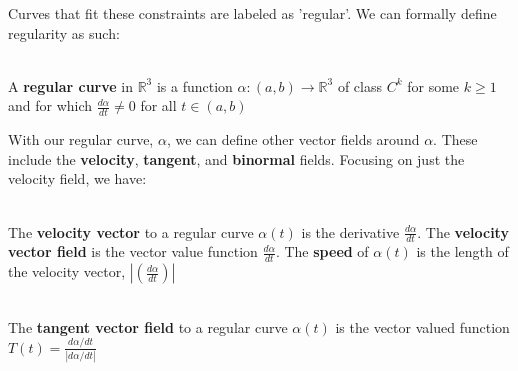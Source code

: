 \documentclass{article}
\newcommand{\bb}[1]{\mathbb{#1}}
\begin{document}
Curves that fit these constraints are labeled as 'regular'.
We can formally define regularity as such:

\begin{definition}\ \\
  A \textbf{regular curve} in $\bb{R}^3$ is a function
  $\alpha: (a, b) \rightarrow \bb{R}^3$
  of class $C^k$ for some $k \ge 1$ and for which
  $\frac{d\alpha}{dt} \ne 0$ for all $t \in (a, b)$
\end{definition}

With our regular curve, $\alpha$, we can define other vector fields
around $\alpha$.
These include the \textbf{velocity}, \textbf{tangent}, and \textbf{binormal} fields.
Focusing on just the velocity field, we have:

\begin{definition} \ \\
  The \textbf{velocity vector} to a regular curve $\alpha(t)$
  is the derivative $\frac{d\alpha}{dt}$.
  The \textbf{velocity vector field} is the vector value function $\frac{d\alpha}{dt}.$
  The \textbf{speed} of $\alpha(t)$ is the length of the velocity vector,
  $|(\frac{d\alpha}{dt})|$
\end{definition}

\begin{definition} \ \\
  The \textbf{tangent vector field} to a regular curve $\alpha(t)$
  is the vector valued function $T(t) = \frac{d\alpha/dt}{|d\alpha/dt|}$
\end{definition}





\end{document}

